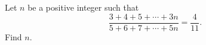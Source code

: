 Let $n$ be a positive integer such that
\[\dfrac{3+4+5+\cdots+3n}{5+6+7+\cdots+5n}=\dfrac4{11}.\]
Find $n$.
